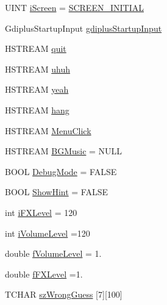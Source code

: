 \begin{DoxyCompactItemize}
\item 
U\+I\+N\+T \hyperlink{_b_o_w-a_01film_01guessing_01game_8cpp_a2fc578768f4bc136312d3d154752668f}{i\+Screen} = \hyperlink{_b_o_w-a_01film_01guessing_01game_8cpp_a5331f2f48cc2652a72c20bc4826946ed}{S\+C\+R\+E\+E\+N\+\_\+\+I\+N\+I\+T\+I\+A\+L}
\item 
Gdiplus\+Startup\+Input \hyperlink{_b_o_w-a_01film_01guessing_01game_8cpp_a3391e353e9dd078052293d5bce1f786c}{gdiplus\+Startup\+Input}
\item 
H\+S\+T\+R\+E\+A\+M \hyperlink{_b_o_w-a_01film_01guessing_01game_8cpp_a08dcb39799175d7c285e85f952c6cae0}{quit}
\item 
H\+S\+T\+R\+E\+A\+M \hyperlink{_b_o_w-a_01film_01guessing_01game_8cpp_a93cad2fb0e5395146ea60cfd24de90bf}{uhuh}
\item 
H\+S\+T\+R\+E\+A\+M \hyperlink{_b_o_w-a_01film_01guessing_01game_8cpp_a3ac190655e22c3f8fb5c499134d11c13}{yeah}
\item 
H\+S\+T\+R\+E\+A\+M \hyperlink{_b_o_w-a_01film_01guessing_01game_8cpp_acdde03058563bb0178660fb650bc1b90}{hang}
\item 
H\+S\+T\+R\+E\+A\+M \hyperlink{_b_o_w-a_01film_01guessing_01game_8cpp_a3262b00c8915b649e2577ff5c37c9f86}{Menu\+Click}
\item 
H\+S\+T\+R\+E\+A\+M \hyperlink{_b_o_w-a_01film_01guessing_01game_8cpp_ad093fa3d7a856a0f74bbf603202402d1}{B\+G\+Music} = N\+U\+L\+L
\item 
B\+O\+O\+L \hyperlink{_b_o_w-a_01film_01guessing_01game_8cpp_aa24733944d268c93321f9e5c0d7a1d0c}{Debug\+Mode} = F\+A\+L\+S\+E
\item 
B\+O\+O\+L \hyperlink{_b_o_w-a_01film_01guessing_01game_8cpp_a34f4e61985cc9c9802de019181a92057}{Show\+Hint} = F\+A\+L\+S\+E
\item 
int \hyperlink{_b_o_w-a_01film_01guessing_01game_8cpp_a05dd3dfc153be3477d3fb9560f5283d6}{i\+F\+X\+Level} = 120
\item 
int \hyperlink{_b_o_w-a_01film_01guessing_01game_8cpp_ae85a7c952565937ee7e9df5d0507fd33}{i\+Volume\+Level} =120
\item 
double \hyperlink{_b_o_w-a_01film_01guessing_01game_8cpp_abf7240438cea784c260c523f712efb7b}{f\+Volume\+Level} = 1.
\item 
double \hyperlink{_b_o_w-a_01film_01guessing_01game_8cpp_a2343f912f77bd8c880abaf1f2c8ea4ce}{f\+F\+X\+Level} =1.
\item 
T\+C\+H\+A\+R \hyperlink{_b_o_w-a_01film_01guessing_01game_8cpp_a8837e0ecc39b8b0f1aa81db475440cfc}{sz\+Wrong\+Guess} \mbox{[}7\mbox{]}\mbox{[}100\mbox{]}

\end{DoxyCompactItemize}
